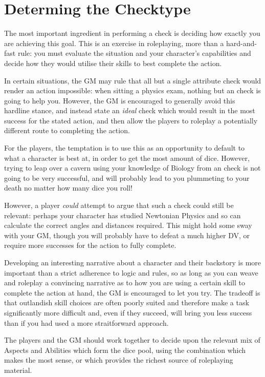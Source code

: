 \section{Determing the Checktype}



The most important ingredient in performing a check is deciding how exactly you are achieving this goal. This is an exercise in roleplaying, more than a hard-and-fast rule: you must evaluate the situation and your character's capabilities and decide how they would utilise their skills to best complete the action. 

In certain situations, the GM may rule that all but a single attribute check would render an action impossible: when sitting a physics exam, nothing but an  check is going to help you. However, the GM is encouraged to generally avoid this hardline stance, and instead state an {\it ideal} check which would result in the most success for the stated action, and then allow the players to roleplay a potentially different route to completing the action. 

For the players, the temptation is to use this as an opportunity to default to what a character is best at, in order to get the most amount of dice. However, trying to leap over a cavern using your knowledge of Biology from an  check is not going to be very successful, and will probably lead to you plummeting to your death no matter how many dice you roll! 

However, a player {\it could} attempt to argue that such a check could still be relevant: perhaps your character has studied Newtonian Physics and so can calculate the correct angles and distances required. This might hold some sway with your GM, though you will probably have to defeat a much higher DV, or require more successes for the action to fully complete. 

Developing an interesting narrative about a character and their backstory is more important than a strict adherence to logic and rules, so as long as you can weave and roleplay a convincing narrative as to how you are using a certain skill to complete the action at hand, the GM is encouraged to let you try. The tradeoff is that outlandish skill choices are often poorly suited and therefore make a task significantly more difficult and, even if they succeed, will bring you less success than if you had used a more straitforward approach. 

The players and the GM should work together to decide upon the relevant mix of Aspects and Abilities which form the dice pool, using the combination which makes the most sense, or which provides the richest source of roleplaying material. 


